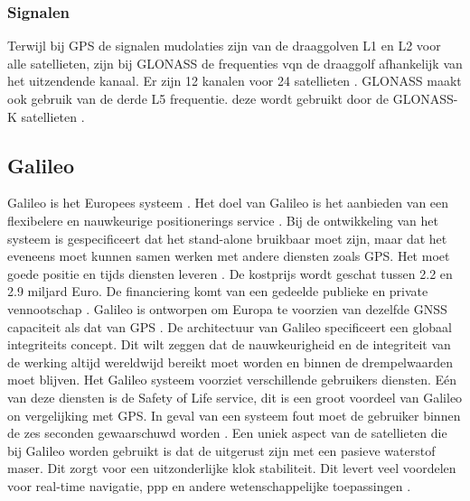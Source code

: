 \subsubsection{Signalen}
Terwijl bij GPS de signalen mudolaties zijn van de draaggolven L1 en L2 voor alle satellieten, zijn bij GLONASS de frequenties vqn de draaggolf afhankelijk van het uitzendende kanaal. Er zijn 12 kanalen voor 24 satellieten \cite{LBibGPS3}. GLONASS maakt ook gebruik van de derde L5 frequentie. deze wordt gebruikt door de GLONASS-K satellieten \cite{LBibGNSS9}.  
 
\subsection{Galileo}
\label{LGal}
Galileo is het Europees systeem \cite{LBibGNSS3, LBibGNSS4}. Het doel van Galileo is het aanbieden van een flexibelere en nauwkeurige positionerings service \cite{LBibGNSS4}. Bij de ontwikkeling van het systeem is gespecificeert dat het stand-alone bruikbaar moet zijn, maar dat het eveneens moet kunnen samen werken met andere diensten zoals GPS. Het moet goede positie en tijds diensten leveren \cite{LBibGalileo2}. De kostprijs wordt geschat tussen 2.2 en 2.9 miljard Euro. De financiering komt van een gedeelde publieke en private vennootschap \cite{LBibGNSS8}. Galileo is ontworpen om Europa te voorzien van dezelfde GNSS capaciteit als dat van GPS \cite{LBibGNSS6}. De architectuur van Galileo specificeert een globaal integriteits concept. Dit wilt zeggen dat de nauwkeurigheid en de integriteit van de werking altijd wereldwijd bereikt moet worden en binnen de drempelwaarden moet blijven.  Het Galileo systeem voorziet verschillende gebruikers diensten. E\'en van deze diensten is de Safety of Life service, dit is een groot voordeel van Galileo  on vergelijking met GPS. In geval van een systeem fout moet de gebruiker binnen de zes seconden gewaarschuwd worden \cite{LBibGalileo}. Een uniek aspect van de satellieten die bij Galileo worden gebruikt is dat de uitgerust zijn met een pasieve waterstof maser. Dit zorgt voor een uitzonderlijke klok stabiliteit. Dit levert veel voordelen voor real-time navigatie, ppp en andere wetenschappelijke toepassingen \cite{LBibGNSS9}.

